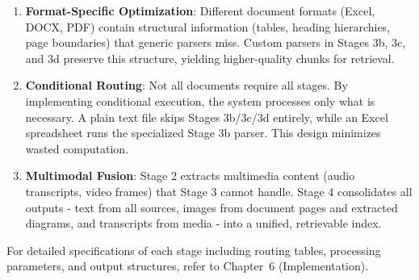 \begin{enumerate}
    \item \textbf{Format-Specific Optimization}: Different document formats (Excel, DOCX, PDF) contain structural information (tables, heading hierarchies, page boundaries) that generic parsers miss. Custom parsers in Stages 3b, 3c, and 3d preserve this structure, yielding higher-quality chunks for retrieval.

    \item \textbf{Conditional Routing}: Not all documents require all stages. By implementing conditional execution, the system processes only what is necessary. A plain text file skips Stages 3b/3c/3d entirely, while an Excel spreadsheet runs the specialized Stage 3b parser. This design minimizes wasted computation.

    \item \textbf{Multimodal Fusion}: Stage 2 extracts multimedia content (audio transcripts, video frames) that Stage 3 cannot handle. Stage 4 consolidates all outputs - text from all sources, images from document pages and extracted diagrams, and transcripts from media - into a unified, retrievable index.
\end{enumerate}

\begin{table}[H]
\centering
\caption{7-Stage Pipeline Summary.}
\label{tab:7stage_quick}
\end{table}

For detailed specifications of each stage including routing tables, processing parameters, and output structures, refer to Chapter~6 (Implementation).

